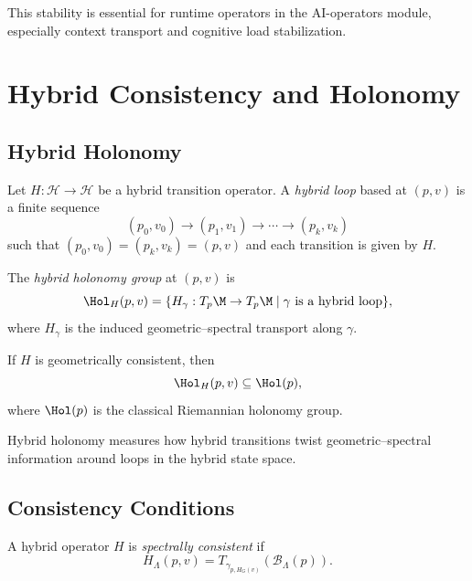 \begin{remark}
This stability is essential for runtime operators in the AI-operators
module, especially context transport and cognitive load stabilization.
\end{remark}

\section{Hybrid Consistency and Holonomy}

\subsection{Hybrid Holonomy}

\begin{definition}
Let $H : \mathcal{H} \to \mathcal{H}$ be a hybrid transition operator.
A \emph{hybrid loop} based at $(p,v)$ is a finite sequence
\[
(p_0,v_0) \to (p_1,v_1) \to \cdots \to (p_k,v_k)
\]
such that $(p_0,v_0) = (p_k,v_k) = (p,v)$ and each transition is given by $H$.
\end{definition}

\begin{definition}
The \emph{hybrid holonomy group} at $(p,v)$ is
\[
\Hol_H(p,v)
= \{ H_{\gamma} : T_p\M \to T_p\M \mid \gamma \text{ is a hybrid loop} \},
\]
where $H_{\gamma}$ is the induced geometric–spectral transport along $\gamma$.
\end{definition}

\begin{lemma}
If $H$ is geometrically consistent, then
\[
\Hol_H(p,v) \subseteq \Hol(p),
\]
where $\Hol(p)$ is the classical Riemannian holonomy group.
\end{lemma}

\begin{remark}
Hybrid holonomy measures how hybrid transitions twist geometric–spectral
information around loops in the hybrid state space.
\end{remark}

\subsection{Consistency Conditions}

\begin{definition}
A hybrid operator $H$ is \emph{spectrally consistent} if
\[
H_\Lambda(p,v) = T_{\gamma_{p,H_G(v)}}(\mathcal{B}_\Lambda(p)).
\]
\end{definition}

